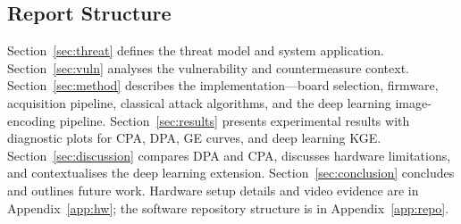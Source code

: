 \subsection*{Report Structure}

Section~\ref{sec:threat} defines the threat model and system application.
Section~\ref{sec:vuln} analyses the vulnerability and countermeasure context.
Section~\ref{sec:method} describes the implementation---board selection,
firmware, acquisition pipeline, classical attack algorithms, and the
deep learning image-encoding pipeline.
Section~\ref{sec:results} presents experimental results with diagnostic plots
for CPA, DPA, GE curves, and deep learning KGE.
Section~\ref{sec:discussion} compares DPA and CPA, discusses hardware
limitations, and contextualises the deep learning extension.
Section~\ref{sec:conclusion} concludes and outlines future work.
Hardware setup details and video evidence are in Appendix~\ref{app:hw};
the software repository structure is in Appendix~\ref{app:repo}.
